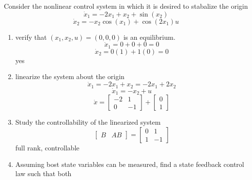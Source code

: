 \item Consider the nonlinear control system in which it is desired to stabalize the origin
  \begin{equation}
    \dot x_1 = -2x_1 + x_2 + \sin(x_2)
  \end{equation}
  \begin{equation}
    \dot x_2 = -x_2\cos(x_1) + \cos(2x_1)u
  \end{equation}
  \begin{enumerate}
  \item verify that $(x_1, x_2, u) = (0,0,0)$ is an equilibrium. \\
    \begin{equation}
      \dot x_1 = 0 + 0 + 0 = 0
    \end{equation}
    \begin{equation}
      \dot x_2 = 0(1) + 1(0) = 0
    \end{equation}
    yes
  \item linearize the system about the origin \\
    \begin{equation}
      \dot x_1 =
      -2x_1 + x_2 =
      -2x_1 + 2x_2
    \end{equation}
    \begin{equation}
      \dot x_1 = -x_2 + u
    \end{equation}
    \begin{equation}
      \dot x =
      \begin{bmatrix}
        -2 & 1 \\
        0 & -1
      \end{bmatrix} +
      \begin{bmatrix}
        0 \\
        1
      \end{bmatrix}
    \end{equation}
  \item Study the controllability of the linearized system \\
    \begin{equation}
      \begin{bmatrix}
        B & AB
      \end{bmatrix} =
      \begin{bmatrix}
        0 & 1 \\
        1 & -1
      \end{bmatrix}
    \end{equation}
    full rank, controllable
  \item Assuming bost state variables can be measured, find a state feedback control law such that both

\end{enumerate}
